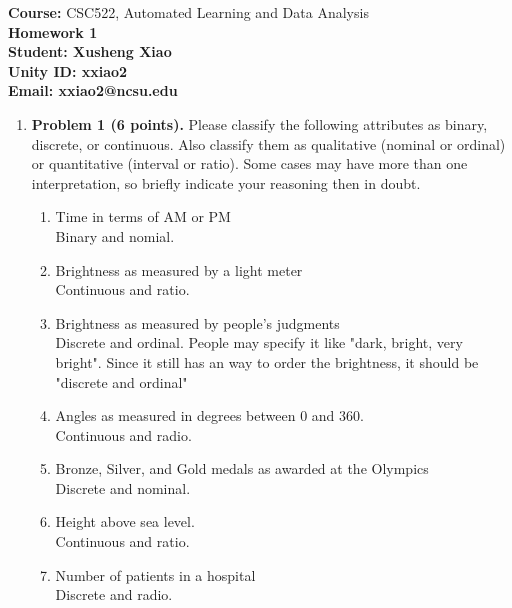 \documentclass{article}%
\begin{document}
\begin{flushleft}
\textbf{Course:} CSC522, Automated Learning and Data Analysis\\
\textbf{Homework 1}\\
\textbf{Student: Xusheng Xiao}\\
\textbf{Unity ID: xxiao2} \\
\textbf{Email: xxiao2@ncsu.edu}
\end{flushleft}

\noindent{\hrulefill}

\bigskip

\begin{enumerate}
	\item \textbf{Problem 1 (6 points).} Please classify the following attributes as binary, discrete, or continuous. Also classify them as qualitative (nominal or ordinal) or quantitative (interval or ratio). Some cases may have more than one interpretation, so briefly indicate your reasoning then in doubt.	
	\begin{enumerate}
		\item Time in terms of AM or PM \\
		Binary and nomial. 	
		
		\item Brightness as measured by a light meter \\
        Continuous and ratio.		
		
		\item Brightness as measured by people’s judgments \\
	    Discrete and ordinal. People may specify it like "dark, bright, very bright". Since it still has an way to order the brightness, it should be "discrete and ordinal"	
		
		\item Angles as measured in degrees between 0 and 360. \\
		Continuous and radio.
		
		\item Bronze, Silver, and Gold medals as awarded at the Olympics \\
		Discrete and nominal.		
		
		\item Height above sea level. \\
		Continuous and ratio.
		
		\item Number of patients in a hospital \\
		Discrete and radio.		
		

\end{enumerate}
\end{enumerate}
\end{document}
